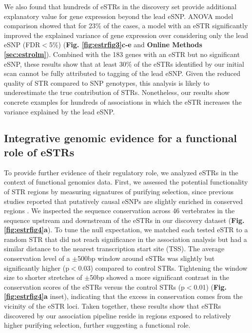 We also found that hundreds of eSTRs in the discovery set provide additional explanatory value for gene expression beyond the lead eSNP. ANOVA model comparison showed that for 23\% of the cases, a model with an eSTR significantly improved the explained variance of gene expression over considering only the lead eSNP (FDR$<$5\%) (\textbf{Fig. \ref{fig:estrfig3}c-e} and \textbf{Online Methods \ref{sec:estrolm}}). Combined with the 183 genes with an eSTR but no significant eSNP, these results show that at least 30\% of the eSTRs identified by our initial scan cannot be fully attributed to tagging of the lead eSNP. Given the reduced quality of STR compared to SNP genotypes, this analysis is likely to underestimate the true contribution of STRs. Nonetheless, our results show concrete examples for hundreds of associations in which the eSTR increases the variance explained by the lead eSNP.

\subsection{Integrative genomic evidence for a functional role of eSTRs}
To provide further evidence of their regulatory role, we analyzed eSTRs in the context of functional genomics data. First, we assessed the potential functionality of STR regions by measuring signatures of purifying selection, since previous studies reported that putatively causal eSNPs are slightly enriched in conserved regions \cite{GaffneyVeyrierasDegnerEtAl2012}.  We inspected the sequence conservation \cite{PollardHubiszRosenbloomEtAl2010} across 46 vertebrates in the sequence upstream and downstream of the eSTRs in our discovery dataset (\textbf{Fig. \ref{fig:estrfig4}a}). To tune the null expectation, we matched each tested eSTR to a random STR that did not reach significance in the association analysis but had a similar distance to the nearest transcription start site (TSS). The average conservation level of a $\pm$500bp window around eSTRs was slightly but significantly higher (p$<$0.03) compared to control STRs. Tightening the window size to shorter stretches of $\pm$50bp showed a more significant contrast in the conservation scores of the eSTRs versus the control STRs (p$<$0.01) (\textbf{Fig. \ref{fig:estrfig4}a} inset), indicating that the excess in conservation comes from the vicinity of the eSTR loci. Taken together, these results show that eSTRs discovered by our association pipeline reside in regions exposed to relatively higher purifying selection, further suggesting a functional role.

